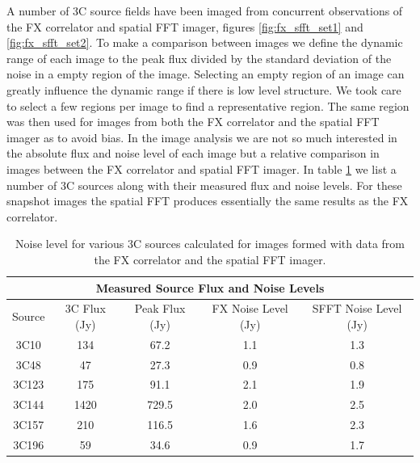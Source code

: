 \documentclass[useAMS,macros,usenatbib,onecolumn]{mn2e}
\begin{document}
A number of 3C source fields have been imaged from concurrent observations of the FX correlator and spatial FFT imager, figures \ref{fig:fx_sfft_set1} and \ref{fig:fx_sfft_set2}.
To make a comparison between images we define the dynamic range of each image to the peak flux divided by the standard deviation of the noise in a empty region of the image.
Selecting an empty region of an image can greatly influence the dynamic range if there is low level structure. 
We took care to select a few regions per image to find a representative region.
The same region was then used for images from both the FX correlator and the spatial FFT imager as to avoid bias.
In the image analysis we are not so much interested in the absolute flux and noise level of each image but a relative comparison in images between the FX correlator and spatial FFT imager.
In table \ref{tbl:src_flux} we list a number of 3C sources along with their measured flux and noise levels.
For these snapshot images the spatial FFT produces essentially the same results as the FX correlator.

\begin{table}
\begin{center}
\begin{tabular}{|c||c|c|c|c|}
\multicolumn{5}{|c|}{Measured Source Flux and Noise Levels}\\
\hline
Source & 3C Flux (Jy) & Peak Flux (Jy) & FX Noise Level (Jy) & SFFT Noise Level (Jy) \\ \hline
    3C10  &   134 &  67.2 & 1.1 & 1.3 \\
    3C48  &    47 &  27.3 & 0.9 & 0.8 \\
    3C123 &   175 &  91.1 & 2.1 & 1.9 \\
    3C144 &  1420 & 729.5 & 2.0 & 2.5 \\
    3C157 &   210 & 116.5 & 1.6 & 2.3 \\
    3C196 &    59 &  34.6 & 0.9 & 1.7 \\ \hline
\end{tabular}
\caption{Noise level for various 3C sources calculated for images formed with data from the FX correlator and the spatial FFT imager.}
\label{tbl:src_flux}
\end{center}
\end{table}
\end{document}
